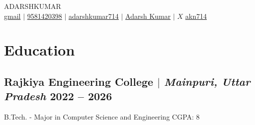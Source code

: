 \documentclass[11pt]{article}
\begin{document}
\begin{center}
    {\fontsize{36}{36}\selectfont\interthin ADARSH\interheavy KUMAR} \\ \bigskip
    {\faEnvelope[regular]} \href{mailto:adarshkumar20012704@gmail.com}{gmail} $|$ 
    {} \href{tel:9581420398}{9581420398} $|$
    {\faGithub} \href{https://github.com/adarshkumar714}{adarshkumar714} $|$
    {\faLinkedinIn} \href{https://www.linkedin.com/in/adarsh-kumar-123a34231/}{Adarsh Kumar} $|$
    {$X$} \href{https://twitter.com/akn714/}{akn714}
\end{center}

\section{Education}

\subsection{Rajkiya Engineering College $|$ {\normalfont\textit{Mainpuri, Uttar Pradesh}} \hfill 2022 -- 2026}
{B.Tech. - Major in Computer Science and Engineering \hfill CGPA: 8}
\end{document}
